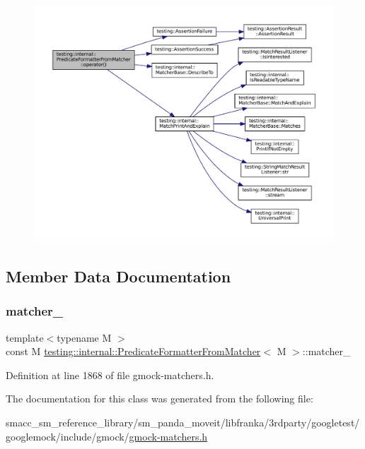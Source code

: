 \nopagebreak
\begin{figure}[H]
\begin{center}
\leavevmode
\includegraphics[width=350pt]{classtesting_1_1internal_1_1PredicateFormatterFromMatcher_a51d28bee5f86347ea34b7a0f2758b599_cgraph}
\end{center}
\end{figure}


\subsection{Member Data Documentation}
\mbox{\label{classtesting_1_1internal_1_1PredicateFormatterFromMatcher_a487a5e8a5f082947d060b1e07112b38d}} 
\subsubsection{\texorpdfstring{matcher\+\_\+}{matcher\_}}
{\footnotesize\ttfamily template$<$typename M $>$ \\
const M \hyperlink{classtesting_1_1internal_1_1PredicateFormatterFromMatcher}{testing\+::internal\+::\+Predicate\+Formatter\+From\+Matcher}$<$ M $>$\+::matcher\+\_\+\hspace{0.3cm}{\ttfamily [private]}}



Definition at line 1868 of file gmock-\/matchers.\+h.



The documentation for this class was generated from the following file\+:\begin{DoxyCompactItemize}
\item 
smacc\+\_\+sm\+\_\+reference\+\_\+library/sm\+\_\+panda\+\_\+moveit/libfranka/3rdparty/googletest/googlemock/include/gmock/\hyperlink{gmock-matchers_8h}{gmock-\/matchers.\+h}\end{DoxyCompactItemize}
